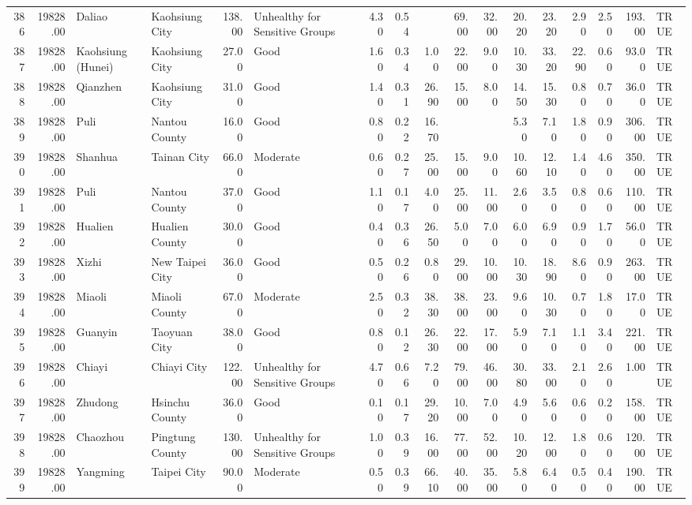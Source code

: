 \begin{table}[ht]
\begin{tabular}{rrllrlrrrrrrrrrrl}
  386 & 19828.00 & Daliao & Kaohsiung City & 138.00 & Unhealthy for Sensitive Groups & 4.30 & 0.54 &  & 69.00 & 32.00 & 20.20 & 23.20 & 2.90 & 2.50 & 193.00 & TRUE \\ 
  387 & 19828.00 & Kaohsiung (Hunei) & Kaohsiung City & 27.00 & Good & 1.60 & 0.34 & 1.00 & 22.00 & 9.00 & 10.30 & 33.20 & 22.90 & 0.60 & 93.00 & TRUE \\ 
  388 & 19828.00 & Qianzhen & Kaohsiung City & 31.00 & Good & 1.40 & 0.31 & 26.90 & 15.00 & 8.00 & 14.50 & 15.30 & 0.80 & 0.70 & 36.00 & TRUE \\ 
  389 & 19828.00 & Puli & Nantou County & 16.00 & Good & 0.80 & 0.22 & 16.70 &  &  & 5.30 & 7.10 & 1.80 & 0.90 & 306.00 & TRUE \\ 
  390 & 19828.00 & Shanhua & Tainan City & 66.00 & Moderate & 0.60 & 0.27 & 25.00 & 15.00 & 9.00 & 10.60 & 12.10 & 1.40 & 4.60 & 350.00 & TRUE \\ 
  391 & 19828.00 & Puli & Nantou County & 37.00 & Good & 1.10 & 0.17 & 4.00 & 25.00 & 11.00 & 2.60 & 3.50 & 0.80 & 0.60 & 110.00 & TRUE \\ 
  392 & 19828.00 & Hualien & Hualien County & 30.00 & Good & 0.40 & 0.36 & 26.50 & 5.00 & 7.00 & 6.00 & 6.90 & 0.90 & 1.70 & 56.00 & TRUE \\ 
  393 & 19828.00 & Xizhi & New Taipei City & 36.00 & Good & 0.50 & 0.26 & 0.80 & 29.00 & 10.00 & 10.30 & 18.90 & 8.60 & 0.90 & 263.00 & TRUE \\ 
  394 & 19828.00 & Miaoli & Miaoli County & 67.00 & Moderate & 2.50 & 0.32 & 38.30 & 38.00 & 23.00 & 9.60 & 10.30 & 0.70 & 1.80 & 17.00 & TRUE \\ 
  395 & 19828.00 & Guanyin & Taoyuan City & 38.00 & Good & 0.80 & 0.12 & 26.30 & 22.00 & 17.00 & 5.90 & 7.10 & 1.10 & 3.40 & 221.00 & TRUE \\ 
  396 & 19828.00 & Chiayi & Chiayi City & 122.00 & Unhealthy for Sensitive Groups & 4.70 & 0.66 & 7.20 & 79.00 & 46.00 & 30.80 & 33.00 & 2.10 & 2.60 & 1.00 & TRUE \\ 
  397 & 19828.00 & Zhudong & Hsinchu County & 36.00 & Good & 0.10 & 0.17 & 29.20 & 10.00 & 7.00 & 4.90 & 5.60 & 0.60 & 0.20 & 158.00 & TRUE \\ 
  398 & 19828.00 & Chaozhou & Pingtung County & 130.00 & Unhealthy for Sensitive Groups & 1.00 & 0.39 & 16.00 & 77.00 & 52.00 & 10.20 & 12.00 & 1.80 & 0.60 & 120.00 & TRUE \\ 
  399 & 19828.00 & Yangming & Taipei City & 90.00 & Moderate & 0.50 & 0.39 & 66.10 & 40.00 & 35.00 & 5.80 & 6.40 & 0.50 & 0.40 & 190.00 & TRUE \\ 

\end{tabular}
\end{table}
